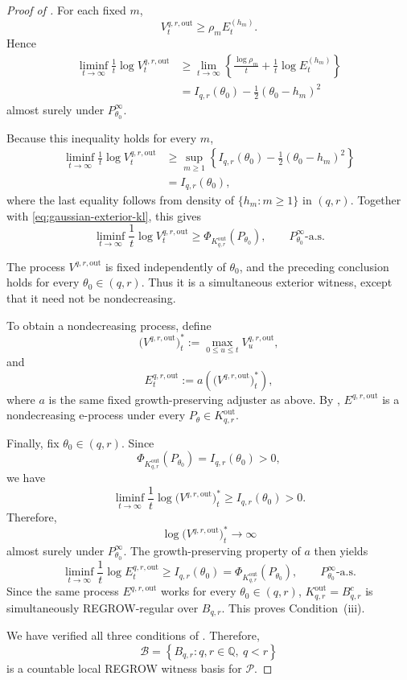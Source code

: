 \documentclass[10pt,a4paper]{amsart}
\begin{document}
\begin{proof}[Proof of ]
For each fixed $m$,
\[
    V_t^{q,r,\mathrm{out}}
    \ge
    \rho_m E_t^{(h_m)}.
\]
Hence
\begin{align*}
    \liminf_{t\to\infty}
    \frac1t
    \log V_t^{q,r,\mathrm{out}}
    &\ge
    \lim_{t\to\infty}
    \left\{
        \frac{\log\rho_m}{t}
        +
        \frac1t\log E_t^{(h_m)}
    \right\}\\
    &=
    I_{q,r}(\theta_0)
    -
    \frac12(\theta_0-h_m)^2
\end{align*}
almost surely under $P_{\theta_0}^\infty$.

Because this inequality holds for every $m$,
\[
\begin{aligned}
    \liminf_{t\to\infty}
    \frac1t
    \log V_t^{q,r,\mathrm{out}}
    &\ge
    \sup_{m\ge1}
    \left\{
        I_{q,r}(\theta_0)
        -
        \frac12(\theta_0-h_m)^2
    \right\}\\
    &=
    I_{q,r}(\theta_0),
\end{aligned}
\]
where the last equality follows from density of
$\{h_m:m\ge1\}$ in $(q,r)$. Together with
\eqref{eq:gaussian-exterior-kl}, this gives
\[
    \liminf_{t\to\infty}
    \frac1t
    \log V_t^{q,r,\mathrm{out}}
    \ge
    \Phi_{K_{q,r}^{\mathrm{out}}}(P_{\theta_0}),
    \qquad
    P_{\theta_0}^\infty\text{-a.s.}
\]

The process $V^{q,r,\mathrm{out}}$ is fixed independently of
$\theta_0$, and the preceding conclusion holds for every
$\theta_0\in(q,r)$. Thus it is a simultaneous exterior witness,
except that it need not be nondecreasing.

To obtain a nondecreasing process, define
\[
    \bigl(V^{q,r,\mathrm{out}}\bigr)_t^*
    :=
    \max_{0\le u\le t}
    V_u^{q,r,\mathrm{out}},
\]
and
\[
    E_t^{q,r,\mathrm{out}}
    :=
    a\left(
        \bigl(V^{q,r,\mathrm{out}}\bigr)_t^*
    \right),
\]
where $a$ is the same fixed growth-preserving adjuster as above.
By ,
$E^{q,r,\mathrm{out}}$ is a nondecreasing e-process under every
$P_\theta\in K_{q,r}^{\mathrm{out}}$.

Finally, fix $\theta_0\in(q,r)$. Since
\[
    \Phi_{K_{q,r}^{\mathrm{out}}}(P_{\theta_0})
    =
    I_{q,r}(\theta_0)
    >0,
\]
we have
\[
    \liminf_{t\to\infty}
    \frac1t
    \log
    \bigl(V^{q,r,\mathrm{out}}\bigr)_t^*
    \ge
    I_{q,r}(\theta_0)>0.
\]
Therefore,
\[
    \log
    \bigl(V^{q,r,\mathrm{out}}\bigr)_t^*
    \longrightarrow\infty
\]
almost surely under $P_{\theta_0}^\infty$. The
growth-preserving property of $a$ then yields
\[
    \liminf_{t\to\infty}
    \frac1t
    \log E_t^{q,r,\mathrm{out}}
    \ge
    I_{q,r}(\theta_0)
    =
    \Phi_{K_{q,r}^{\mathrm{out}}}(P_{\theta_0}),
    \qquad
    P_{\theta_0}^\infty\text{-a.s.}
\]
Since the same process $E^{q,r,\mathrm{out}}$ works for every
$\theta_0\in(q,r)$,
$K_{q,r}^{\mathrm{out}}=B_{q,r}^c$ is simultaneously
REGROW-regular over $B_{q,r}$. This proves
Condition~\textup{(iii)}.

We have verified all three conditions of
. Therefore,
\[
    \mathscr B
    =
    \left\{
        B_{q,r}:q,r\in\mathbb Q,\ q<r
    \right\}
\]
is a countable local REGROW witness basis for
$\mathcal P$.
\end{proof}
\end{document}
